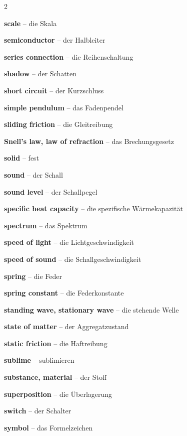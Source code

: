 \begin{multicols}{2}
\par\nopagebreak
\textbf{scale} -- die Skala\dotfill\hyperref[e:12]{\pageref*{e:12}}\par
\textbf{semiconductor} -- der Halbleiter\dotfill\hyperref[e:152]{\pageref*{e:152}}\par
\textbf{series connection} -- die Reihenschaltung\dotfill\hyperref[e:162]{\pageref*{e:162}}\par
\textbf{shadow} -- der Schatten\dotfill\hyperref[e:225]{\pageref*{e:225}}\par
\textbf{short circuit} -- der Kurzschluss\dotfill\hyperref[e:164]{\pageref*{e:164}}\par
\textbf{simple pendulum} -- das Fadenpendel\dotfill\hyperref[e:191]{\pageref*{e:191}}\par
\textbf{sliding friction} -- die Gleitreibung\dotfill\hyperref[e:68]{\pageref*{e:68}}\par
\textbf{Snell's law, law of refraction} -- das Brechungsgesetz\dotfill\hyperref[e:237]{\pageref*{e:237}}\par
\textbf{solid} -- fest\dotfill\hyperref[e:126]{\pageref*{e:126}}\par
\textbf{sound} -- der Schall\dotfill\hyperref[e:212]{\pageref*{e:212}}\par
\textbf{sound level} -- der Schallpegel\dotfill\hyperref[e:216]{\pageref*{e:216}}\par
\textbf{specific heat capacity} -- die spezifische Wärmekapazität\dotfill\hyperref[e:119]{\pageref*{e:119}}\par
\textbf{spectrum} -- das Spektrum\dotfill\hyperref[e:255]{\pageref*{e:255}}\par
\textbf{speed of light} -- die Lichtgeschwindigkeit\dotfill\hyperref[e:224]{\pageref*{e:224}}\par
\textbf{speed of sound} -- die Schallgeschwindigkeit\dotfill\hyperref[e:213]{\pageref*{e:213}}\par
\textbf{spring} -- die Feder\dotfill\hyperref[e:70]{\pageref*{e:70}}\par
\textbf{spring constant} -- die Federkonstante\dotfill\hyperref[e:72]{\pageref*{e:72}}\par
\textbf{standing wave, stationary wave} -- die stehende Welle\dotfill\hyperref[e:211]{\pageref*{e:211}}\par
\textbf{state of matter} -- der Aggregatzustand\dotfill\hyperref[e:125]{\pageref*{e:125}}\par
\textbf{static friction} -- die Haftreibung\dotfill\hyperref[e:67]{\pageref*{e:67}}\par
\textbf{sublime} -- sublimieren\dotfill\hyperref[e:134]{\pageref*{e:134}}\par
\textbf{substance, material} -- der Stoff\dotfill\hyperref[e:29]{\pageref*{e:29}}\par
\textbf{superposition} -- die Überlagerung\dotfill\hyperref[e:210]{\pageref*{e:210}}\par
\textbf{switch} -- der Schalter\dotfill\hyperref[e:157]{\pageref*{e:157}}\par
\textbf{symbol} -- das Formelzeichen\dotfill\hyperref[e:6]{\pageref*{e:6}}\par


\end{multicols}

